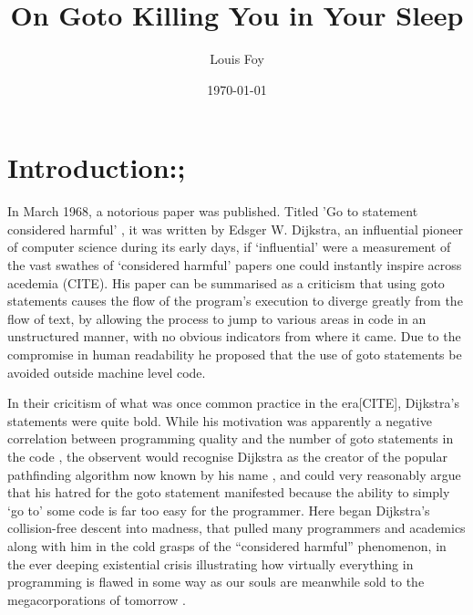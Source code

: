 \documentclass{journal}
\title{On Goto Killing You in Your Sleep}
\author{Louis Foy}
\date{\today}
\begin{document}
\maketitle


\section{\textunderscore \textunderscore Introduction:;}
In March 1968, a notorious paper was published. Titled 'Go to statement considered harmful' \cite{goto}, it was written by Edsger W. Dijkstra, an influential pioneer of computer science during its early days, if `influential' were a measurement of the vast swathes of `considered harmful' papers one could instantly inspire across acedemia (CITE). His paper can be summarised as a criticism that using goto statements causes the flow of the program's execution to diverge greatly from the flow of text, by allowing the process to jump to various areas in code in an unstructured manner, with no obvious indicators from where it came. Due to the compromise in human readability he proposed that the use of goto statements be avoided outside machine level code.

In their cricitism of what was once common practice in the era[CITE], Dijkstra's statements were quite bold. While his motivation was apparently a negative correlation between programming quality and the number of goto statements in the code \cite{goto}, the observent would recognise Dijkstra as the creator of the popular pathfinding algorithm now known by his name \cite{pathfinding}, and could very reasonably argue that his hatred for the goto statement manifested because the ability to simply `go to' some code is far too easy for the programmer. Here began Dijkstra's collision-free descent into madness, that pulled many programmers and academics along with him in the cold grasps of the ``considered harmful'' phenomenon, in the ever deeping existential crisis illustrating how virtually everything in programming is flawed in some way as our souls are meanwhile sold to the megacorporations of tomorrow \cite{truths}.
\end{document}
